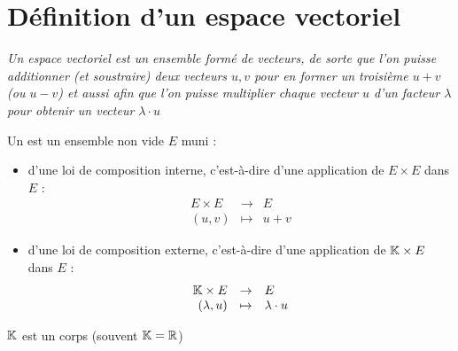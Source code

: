 \section{Définition d'un espace vectoriel}

\begin{frame}

\begin{center}
\begin{minipage}{0.75\textwidth}
\textit{Un espace vectoriel est un ensemble formé de vecteurs, de sorte que l'on puisse
additionner (et soustraire) deux vecteurs $u,v$ pour en former un troisième $u+v$ (ou $u-v$)
et aussi afin que l'on puisse multiplier chaque vecteur $u$ d'un facteur $\lambda$ pour obtenir 
un vecteur $\lambda \cdot u$}
\end{minipage}
\end{center}



\pause

Un  est un ensemble non vide $E$ muni :
\begin{itemize}
  \item d'une loi de composition interne, c'est-à-dire 
  d'une application de $E \times E$ dans $E$ :
$$\begin{array}{rcl}
E \times E & \to & E\\
(u, v) & \mapsto & u+v
\end{array}$$


\pause

  \item d'une loi de composition externe, 
  c'est-à-dire d'une application de $\mathbb{K} \times E$ dans $E$ : 
$$\begin{array}{rcl}
\mathbb{K} \times E & \to & E\\
(\lambda, u ) & \mapsto & \lambda \cdot u 
\end{array}$$

\end{itemize}

\pause

$\mathbb{K}$ est un corps (souvent $\mathbb{K}=\mathbb{R}$)
\end{frame}


